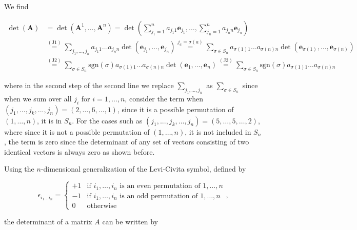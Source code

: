 \documentclass[a4paper,12pt]{report}
\begin{document}
We find

\begin{equation} \label{detdef} 
\begin{aligned}
\det(\mathbf{A}) &= \det(\mathbf{A}^1, \ldots, \mathbf{A}^n) = \det \left( \sum_{j_1=1}^{n} a_{j_1 1} \mathbf{e}_{j_1}, \ldots, \sum_{j_n=1}^{n} a_{j_n n} \mathbf{e}_{j_n} \right) \\ &\overset{(\text{J1})}{=} \sum_{j_1, \ldots, j_n} a_{j_1 1} \ldots a_{j_n n} \det(\mathbf{e}_{j_1}, \ldots, \mathbf{e}_{j_n}) \overset{j_a = \sigma(a)}{=} \sum_{\sigma \in S_n} a_{\sigma(1) 1} \ldots a_{\sigma(n) n} \det(\mathbf{e}_{\sigma(1)}, \ldots, \mathbf{e}_{\sigma(n)}) \\ &\overset{(\text{J2})}{=} \sum_{\sigma \in S_n} \text{sgn}(\sigma) a_{\sigma(1) 1} \ldots a_{\sigma(n) n} \det(\mathbf{e}_1, \ldots, \mathbf{e}_n) \overset{(\text{J3})}{=} \sum_{\sigma \in S_n} \text{sgn}(\sigma) a_{\sigma(1) 1} \ldots a_{\sigma(n) n}
\end{aligned}
\end{equation}

where in the second step of the second line we replace \(\sum_{j_1 ,..., j_{n} }^{} \) as \(\sum_{\sigma \in S_{n} }^{} \) since when we sum over all \(j_{i}\) for \(i = 1,\ldots ,n\), consider the term when \((j_1 , ..., j_{k}, ..., j_{n}) = (2,\ldots ,6,\ldots ,1)\), since it is a possible permutation of \((1,\ldots ,n)\), it is in \(S_{n} \). For the cases such as \((j_1 , ..., j_{k}, ..., j_{n}) = (5,\ldots ,5,\ldots ,2)\), where since it is not a possible permutation of \((1,\ldots ,n)\), it is not included in \(S_{n} \), the term is zero since the determinant of any set of vectors consisting of two identical vectors is always zero as shown before.



Using the \(n\)-dimensional generalization of the Levi-Civita symbol, defined by 

\begin{equation}
    \epsilon_{i_1 \ldots  i_n} = 
    \begin{cases} 
    +1 & \text{if } i_1, \ldots, i_n \text{ is an even permutation of } 1, \ldots, n \\ 
    -1 & \text{if } i_1, \ldots, i_n \text{ is an odd permutation of } 1, \ldots, n \\ 
    0 & \text{otherwise} 
    \end{cases},
\end{equation}
    
the determinant of a matrix \(A\) can be written by
\end{document}
